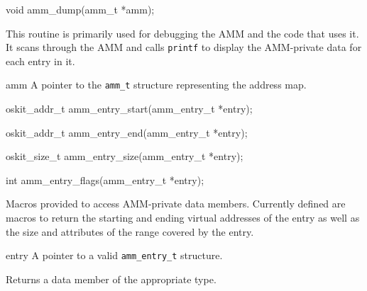 \begin{apisyn}

	\funcproto void amm_dump(amm_t *amm);
\end{apisyn}
\begin{apidesc}
	This routine is primarily used for debugging the AMM
	and the code that uses it.
	It scans through the AMM
	and calls {\tt printf} to display the AMM-private data for each
	entry in it.
\end{apidesc}
\begin{apiparm}
	\item[amm]
		A pointer to the {\tt amm_t} structure
		representing the address map.
\end{apiparm}


\begin{apisyn}

	\funcproto oskit_addr_t amm_entry_start(amm_entry_t *entry);

	\funcproto oskit_addr_t amm_entry_end(amm_entry_t *entry);

	\funcproto oskit_size_t amm_entry_size(amm_entry_t *entry);

	\funcproto int amm_entry_flags(amm_entry_t *entry);
\end{apisyn}
\begin{apidesc}
	Macros provided to access AMM-private data members.
	Currently defined are macros to
	return the starting and ending virtual addresses of the entry
	as well as the size and attributes of the range covered by the entry.
\end{apidesc}
\begin{apiparm}
	\item[entry]
		A pointer to a valid {\tt amm_entry_t} structure.
\end{apiparm}
\begin{apiret}
	Returns a data member of the appropriate type.
\end{apiret}


